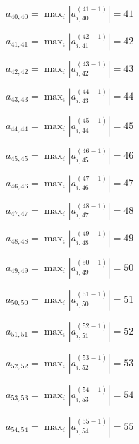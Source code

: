 \documentclass[a4paper,12pt]{article}
\begin{document}
$a _{ 40, 40 } =  \max _i |a _{ i, 40 } ^{ (41 - 1) } | = 41$

$a _{ 41, 41 } =  \max _i |a _{ i, 41 } ^{ (42 - 1) } | = 42$

$a _{ 42, 42 } =  \max _i |a _{ i, 42 } ^{ (43 - 1) } | = 43$

$a _{ 43, 43 } =  \max _i |a _{ i, 43 } ^{ (44 - 1) } | = 44$

$a _{ 44, 44 } =  \max _i |a _{ i, 44 } ^{ (45 - 1) } | = 45$

$a _{ 45, 45 } =  \max _i |a _{ i, 45 } ^{ (46 - 1) } | = 46$

$a _{ 46, 46 } =  \max _i |a _{ i, 46 } ^{ (47 - 1) } | = 47$

$a _{ 47, 47 } =  \max _i |a _{ i, 47 } ^{ (48 - 1) } | = 48$

$a _{ 48, 48 } =  \max _i |a _{ i, 48 } ^{ (49 - 1) } | = 49$

$a _{ 49, 49 } =  \max _i |a _{ i, 49 } ^{ (50 - 1) } | = 50$

$a _{ 50, 50 } =  \max _i |a _{ i, 50 } ^{ (51 - 1) } | = 51$

$a _{ 51, 51 } =  \max _i |a _{ i, 51 } ^{ (52 - 1) } | = 52$

$a _{ 52, 52 } =  \max _i |a _{ i, 52 } ^{ (53 - 1) } | = 53$

$a _{ 53, 53 } =  \max _i |a _{ i, 53 } ^{ (54 - 1) } | = 54$

$a _{ 54, 54 } =  \max _i |a _{ i, 54 } ^{ (55 - 1) } | = 55$
\end{document}
